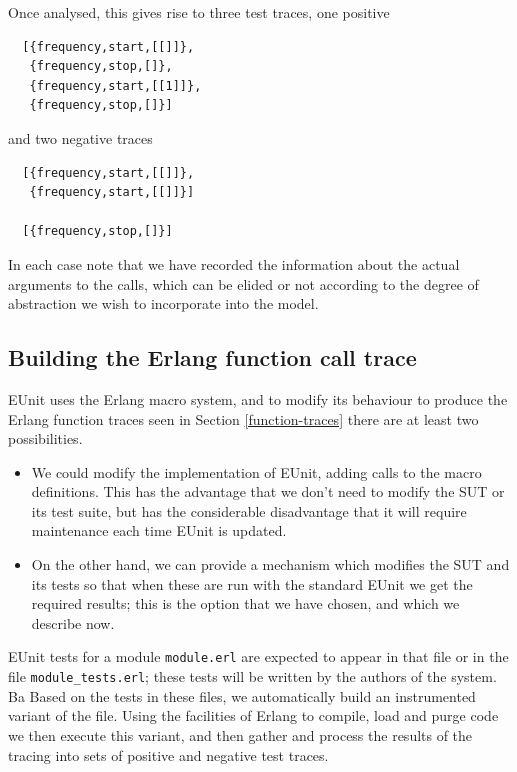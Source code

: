 \documentclass[]{sigplanconf}
\begin{document}
Once analysed, this gives rise to three test traces, one positive
\begin{verbatim}
  [{frequency,start,[[]]},
   {frequency,stop,[]},
   {frequency,start,[[1]]},
   {frequency,stop,[]}]
\end{verbatim}
and two negative traces
\begin{verbatim}
  [{frequency,start,[[]]},
   {frequency,start,[[]]}]
   
  [{frequency,stop,[]}]
\end{verbatim}
In each case note that we have recorded the information about the actual arguments to the calls, which can be elided or not according to the degree of abstraction we wish to incorporate into the model.

\subsection{Building the Erlang function call trace}

EUnit uses the Erlang macro system, and to modify its behaviour to produce the Erlang function traces seen in Section \ref{function-traces} there are at least two possibilities.
\begin{itemize}
\item
We could modify the implementation of EUnit, adding calls to the macro definitions. This has the advantage that we don't need to modify the SUT or its test suite, but has the considerable disadvantage that it will require maintenance each time EUnit is updated.
\item
On the other hand, we can provide a mechanism which modifies the SUT and its tests so that when these are run with the standard EUnit we get the required results; this is the option that we have chosen, and which we describe now.
\end{itemize}
EUnit tests for a module \texttt{module.erl} are expected to appear in that file or in the file \texttt{module\_tests.erl}; these tests will be written by the authors of the system. Ba
Based on the tests in these files, we automatically build an instrumented variant of the file. Using the facilities of Erlang to compile, load and purge code we then execute this variant, and then gather and process the results of the tracing into sets of positive and negative test traces.
\end{document}
